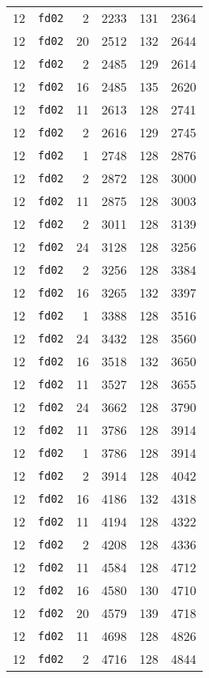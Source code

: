 \documentclass{article}
\begin{document}
\begin{table}[h!]
\begin{tabular}{llrrrl}
    12 & \texttt{fd02} & 2 & 2233 & 131 & 2364 \\
    12 & \texttt{fd02} & 20 & 2512 & 132 & 2644 \\
    12 & \texttt{fd02} & 2 & 2485 & 129 & 2614 \\
    12 & \texttt{fd02} & 16 & 2485 & 135 & 2620 \\
    12 & \texttt{fd02} & 11 & 2613 & 128 & 2741 \\
    12 & \texttt{fd02} & 2 & 2616 & 129 & 2745 \\
    12 & \texttt{fd02} & 1 & 2748 & 128 & 2876 \\
    12 & \texttt{fd02} & 2 & 2872 & 128 & 3000 \\
    12 & \texttt{fd02} & 11 & 2875 & 128 & 3003 \\
    12 & \texttt{fd02} & 2 & 3011 & 128 & 3139 \\
    12 & \texttt{fd02} & 24 & 3128 & 128 & 3256 \\
    12 & \texttt{fd02} & 2 & 3256 & 128 & 3384 \\
    12 & \texttt{fd02} & 16 & 3265 & 132 & 3397 \\
    12 & \texttt{fd02} & 1 & 3388 & 128 & 3516 \\
    12 & \texttt{fd02} & 24 & 3432 & 128 & 3560 \\
    12 & \texttt{fd02} & 16 & 3518 & 132 & 3650 \\
    12 & \texttt{fd02} & 11 & 3527 & 128 & 3655 \\
    12 & \texttt{fd02} & 24 & 3662 & 128 & 3790 \\
    12 & \texttt{fd02} & 11 & 3786 & 128 & 3914 \\
    12 & \texttt{fd02} & 1 & 3786 & 128 & 3914 \\
    12 & \texttt{fd02} & 2 & 3914 & 128 & 4042 \\
    12 & \texttt{fd02} & 16 & 4186 & 132 & 4318 \\
    12 & \texttt{fd02} & 11 & 4194 & 128 & 4322 \\
    12 & \texttt{fd02} & 2 & 4208 & 128 & 4336 \\
    12 & \texttt{fd02} & 11 & 4584 & 128 & 4712 \\
    12 & \texttt{fd02} & 16 & 4580 & 130 & 4710 \\
    12 & \texttt{fd02} & 20 & 4579 & 139 & 4718 \\
    12 & \texttt{fd02} & 11 & 4698 & 128 & 4826 \\
    12 & \texttt{fd02} & 2 & 4716 & 128 & 4844 \\

\end{tabular}
\end{table}
\end{document}
